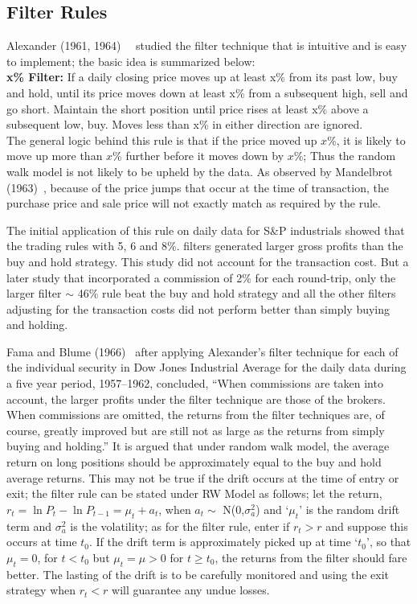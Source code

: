 \subsection{Filter Rules}


Alexander (1961, 1964)~\cite{alexander61}~\cite{alexander64} studied the filter technique that is intuitive and is easy to implement; the basic idea is summarized below: \\


\noindent \textbf{x\% Filter:} If a daily closing price moves up at least x\% from its past low, buy and hold, until its price moves down at least x\% from a subsequent high, sell and go short. Maintain the short position until price rises at least x\% above a subsequent low, buy. Moves less than x\% in either direction are ignored. \\


The general logic behind this rule is that if the price moved up $x$\%, it is likely to move up more than $x$\% further before it moves down by $x$\%; Thus the random walk model is not likely to be upheld by the data. As observed by Mandelbrot (1963)~\cite{mandelbrot}, because of the price jumps that occur at the time of transaction, the purchase price and sale price will not exactly match as required by the rule.


The initial application of this rule on daily data for S\&P industrials showed that the trading rules with 5, 6 and 8\%. filters generated larger gross profits than the buy and hold strategy. This study did not account for the transaction cost. But a later study that incorporated a commission of 2\% for each round-trip, only the larger filter  $\sim$ 46\% rule beat the buy and hold strategy and all the other filters adjusting for the transaction costs did not perform better than simply buying and holding.


Fama and Blume (1966)~\cite{famablume} after applying Alexander's filter technique for each of the individual security in Dow Jones Industrial Average for the daily data during a five year period, 1957--1962, concluded, ``When commissions are taken into account, the larger profits under the filter technique are those of the brokers. When commissions are omitted, the returns from the filter techniques are, of course, greatly improved but are still not as large as the returns from simply buying and holding.'' It is argued that under random walk model, the average return on long positions should be approximately equal to the buy and hold average returns. This may not be true if the drift occurs at the time of entry or exit; the filter rule can be stated under RW Model as follows; let the return, $r_{t} = \ln{P_{t}} - \ln{P_{t-1}} = \mu_{t} + a_{t}$, when $a_{t} \sim$ N(0,$\sigma_{a}^2$) and `$\mu_{t}$' is the random drift term and $\sigma_{a}^2$ is the volatility; as for the filter rule, enter if $r_{t} > r$ and suppose this occurs at time $t_{0}$. If the drift term is approximately picked up at time `$t_{0}$', so that $\mu_{t} = 0$, for $t < t_{0}$ but $\mu_{t} = \mu > 0$ for $t \geq t_{0}$, the returns from the filter should fare better. The lasting of the drift is to be carefully monitored and using the exit strategy when $r_{t} < r$ will guarantee any undue losses.


